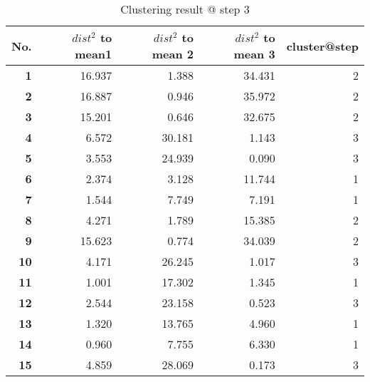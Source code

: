 \begin{table}[htbp]
  \centering
  \caption{Clustering result @ step 3}
    \begin{tabular}{rrrrr}
    \toprule
    \textbf{No.} & \textbf{$dist^2$ to mean1} & \textbf{$dist^2$ to mean 2} & \textbf{$dist^2$ to mean 3} & \textbf{cluster@step} \\
    \midrule
    \textbf{1} & 16.937  & 1.388  & 34.431  & 2 \\
    \textbf{2} & 16.887  & 0.946  & 35.972  & 2 \\
    \textbf{3} & 15.201  & 0.646  & 32.675  & 2 \\
    \textbf{4} & 6.572  & 30.181  & 1.143  & 3 \\
    \textbf{5} & 3.553  & 24.939  & 0.090  & 3 \\
    \textbf{6} & 2.374  & 3.128  & 11.744  & 1 \\
    \textbf{7} & 1.544  & 7.749  & 7.191  & 1 \\
    \textbf{8} & 4.271  & 1.789  & 15.385  & 2 \\
    \textbf{9} & 15.623  & 0.774  & 34.039  & 2 \\
    \textbf{10} & 4.171  & 26.245  & 1.017  & 3 \\
    \textbf{11} & 1.001  & 17.302  & 1.345  & 1 \\
    \textbf{12} & 2.544  & 23.158  & 0.523  & 3 \\
    \textbf{13} & 1.320  & 13.765  & 4.960  & 1 \\
    \textbf{14} & 0.960  & 7.755  & 6.330  & 1 \\
    \textbf{15} & 4.859  & 28.069  & 0.173  & 3 \\
    \bottomrule
    \end{tabular}%
  \label{tab:cluster_b3}%
\end{table}%
